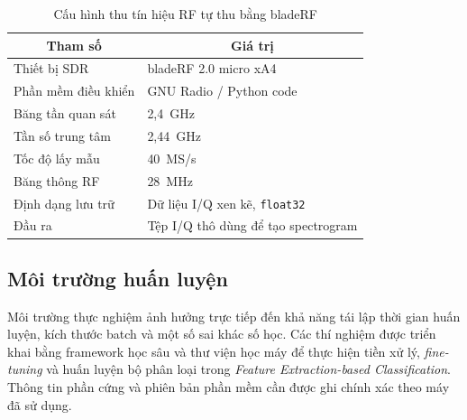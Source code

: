 \documentclass[../DoAn.tex]{subfiles}
\begin{document}
\begin{table}[H]
    \centering
    \renewcommand{\arraystretch}{1.3}
    \small
    \begin{tabular}{|p{}|p{}|}
        \hline
        \multicolumn{1}{|c|}{\textbf{Tham số}} & \multicolumn{1}{c|}{\textbf{Giá trị}} \\ \hline
        Thiết bị SDR & bladeRF 2.0 micro xA4\\ \hline
        Phần mềm điều khiển & GNU Radio / Python code \\ \hline
        Băng tần quan sát & 2,4~GHz \\ \hline
        Tần số trung tâm & 2,44~GHz \\ \hline
        Tốc độ lấy mẫu & 40~MS/s \\ \hline
        Băng thông RF & 28~MHz \\ \hline
        Định dạng lưu trữ & Dữ liệu I/Q xen kẽ, \texttt{float32} \\ \hline
        Đầu ra & Tệp I/Q thô dùng để tạo spectrogram \\ \hline
    \end{tabular}
    \caption{Cấu hình thu tín hiệu RF tự thu bằng bladeRF}
    \label{tab:bladerf_capture_setup}
\end{table}

\subsection{Môi trường huấn luyện}

Môi trường thực nghiệm ảnh hưởng trực tiếp đến khả năng tái lập thời gian huấn luyện, kích thước batch và một số sai khác số học. Các thí nghiệm được triển khai bằng framework học sâu và thư viện học máy để thực hiện tiền xử lý, \textit{fine-tuning} và huấn luyện bộ phân loại trong \textit{Feature Extraction-based Classification}. Thông tin phần cứng và phiên bản phần mềm cần được ghi chính xác theo máy đã sử dụng.
\end{document}
